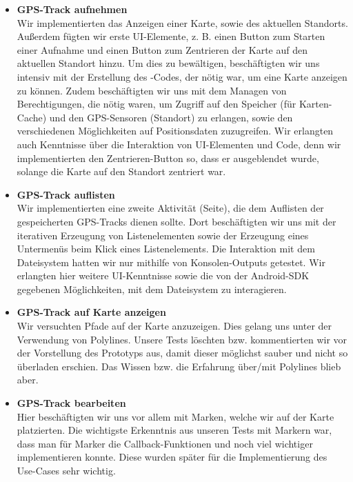 \documentclass[10pt]{article}
\begin{document}
\begin{itemize}
\item \textbf{GPS-Track aufnehmen}\\
Wir implementierten das Anzeigen einer Karte, sowie des aktuellen Standorts.
Außerdem fügten wir erste UI-Elemente, z. B. einen Button zum Starten einer Aufnahme und einen Button
zum Zentrieren der Karte auf den aktuellen Standort hinzu. Um dies zu bewältigen, beschäftigten
wir uns intensiv mit der Erstellung des -Codes, der nötig war, um eine Karte anzeigen
zu können. Zudem beschäftigten wir uns mit dem Managen von Berechtigungen,
die nötig waren, um Zugriff auf den Speicher (für Karten-Cache) und
den GPS-Sensoren (Standort) zu erlangen, sowie den verschiedenen Möglichkeiten auf Positionsdaten zuzugreifen.
Wir erlangten auch Kenntnisse über die Interaktion von UI-Elementen und Code, denn wir implementierten den
Zentrieren-Button so, dass er ausgeblendet wurde, solange die Karte auf den Standort zentriert war.
\item \textbf{GPS-Track auflisten}\\
Wir implementierten eine zweite Aktivität (Seite), die dem Auflisten der gespeicherten GPS-Tracks dienen
sollte. Dort beschäftigten wir uns mit der iterativen Erzeugung von Listenelementen sowie der Erzeugung
eines Untermenüs beim Klick eines Listenelements. Die Interaktion mit dem Dateisystem hatten wir nur mithilfe
von Konsolen-Outputs getestet. Wir erlangten hier weitere UI-Kenntnisse sowie die von der Android-SDK gegebenen
Möglichkeiten, mit dem Dateisystem zu interagieren.
\item \textbf{GPS-Track auf Karte anzeigen}\\
Wir versuchten Pfade auf der Karte anzuzeigen. Dies gelang uns unter der Verwendung von Polylines.
Unsere Tests löschten bzw. kommentierten wir vor der Vorstellung des Prototyps aus, damit dieser möglichst
sauber und nicht so überladen erschien. Das Wissen bzw. die Erfahrung über/mit Polylines blieb aber.
\item \textbf{GPS-Track bearbeiten}\\
Hier beschäftigten wir uns vor allem mit Marken, welche wir auf der Karte platzierten.
Die wichtigste Erkenntnis aus unseren Tests mit Markern war, dass man für Marker die
Callback-Funktionen  und noch viel wichtiger  implementieren konnte.
Diese wurden später für die Implementierung des Use-Cases sehr wichtig.
\end{itemize}
\end{document}
